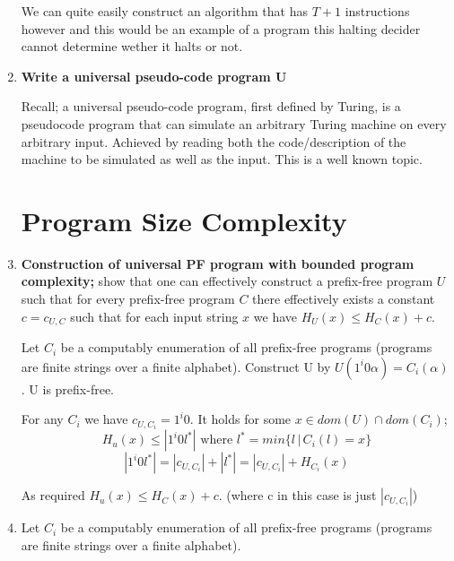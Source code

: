 \documentclass{article}
\newenvironment{answered}{\par\normalfont}{}
\begin{document}
\begin{enumerate}
\begin{answered}
We can quite easily construct an algorithm that has $T+1$ instructions however and this would be an example of a program this halting decider cannot determine wether it halts or not. 
	\end{answered}

\item{\textbf{Write a universal pseudo-code program U}}

	\begin{answered}
	Recall; a universal pseudo-code program, first defined by Turing, is a pseudocode program that can simulate an arbitrary Turing machine on every arbitrary input. Achieved by reading both the code/description of the machine to be simulated as well as the input. This is a well known topic.
	\end{answered}

	\section{Program Size Complexity}

\item{\textbf{Construction of universal PF program with bounded program complexity;}}
show that one can effectively construct a prefix-free program $U$ such that for every prefix-free program $C$ there effectively exists a constant $c=c_{U,C}$ such that for each input string $x$ we have $H_U(x)\leq H_C(x)+c$.

\begin{answered}
	Let $C_i$ be a computably enumeration of all prefix-free programs (programs are finite strings over a finite alphabet).
	Construct U by $U(1^i0\alpha) = C_i(\alpha)$. U is prefix-free.

	For any $C_i$ we have $c_{U,C_i} = 1^i0$. It holds for some $x \in dom(U) \cap dom(C_i)$;
	\begin{equation}
		H_u(x) \leq |1^i0l^*| \text{ where } l^* = min\{l \,|\, C_i(l) = x\}
	\end{equation}
	\begin{equation}
		|1^i0l^*| = |c_{U,C_i}| + |l^*| = |c_{U,C_i}| + H_{C_i}(x)
	\end{equation}

	As required $H_u(x) \leq H_C(x) + c$. (where c in this case is just $|c_{U,C_i}|$)

\end{answered}

\item{Let $C_i$ be a computably enumeration of all prefix-free programs (programs are finite strings over a finite alphabet).}
	

\end{enumerate}
\end{document}
